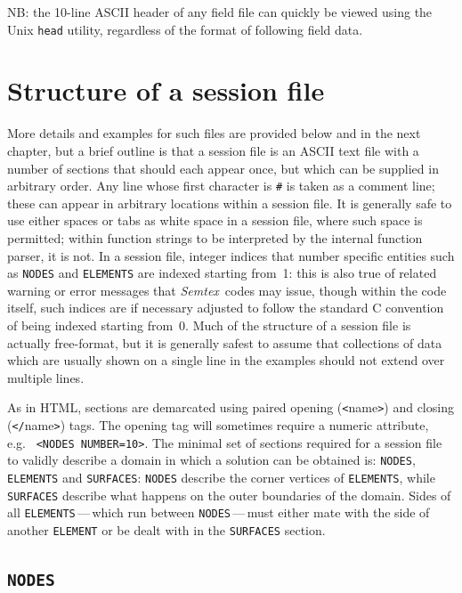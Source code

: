 \documentclass[11pt]{report}
\newcommand{\Semtex}{\emph{Semtex}} \newcommand{\Dog}{\emph{Dog}}
\newcommand{\eg}{e.g.\ } \newcommand{\CC}{\mathrm{c.c.}}
\begin{document}
NB: the 10-line ASCII header of any field file can quickly be viewed
using the Unix \verb|head| utility, regardless of the format of
following field data.

\section{Structure of a session file}
\label{sec.session}

More details and examples for such files are provided below and in the
next chapter, but a brief outline is that a session file is an ASCII
text file with a number of sections that should each appear once, but
which can be supplied in arbitrary order.  Any line whose first
character is \verb+#+ is taken as a comment line; these can appear in
arbitrary locations within a session file.  It is generally safe to
use either spaces or tabs as white space in a session file, where such
space is permitted; within function strings to be interpreted by the
internal function parser, it is not.  In a session file, integer
indices that number specific entities such as \verb|NODES| and
\verb|ELEMENTS| are indexed starting from~1: this is also true of
related warning or error messages that \Semtex\ codes may issue,
though within the code itself, such indices are if necessary adjusted
to follow the standard C convention of being indexed starting from~0.
Much of the structure of a session file is actually free-format, but
it is generally safest to assume that collections of data which are
usually shown on a single line in the examples should not extend over
multiple lines.

As in HTML, sections are demarcated using paired opening
(\verb+<+name\verb+>+) and closing (\verb+</+name\verb+>+) tags.  The
opening tag will sometimes require a numeric attribute, \eg
\verb+<NODES NUMBER=10>+.  The minimal set of sections required for a
session file to validly describe a domain in which a solution can be
obtained is: \verb+NODES+, \verb+ELEMENTS+ and \verb+SURFACES+:
\verb+NODES+ describe the corner vertices of \verb+ELEMENTS+, while
\verb+SURFACES+ describe what happens on the outer boundaries of the
domain. Sides of all \verb+ELEMENTS+\,---\,which run between
\verb+NODES+\,---\,must either mate with the side of another
\verb+ELEMENT+ or be dealt with in the \verb+SURFACES+ section.

\subsection{\texttt{NODES}}
\label{sec.nodes}
\end{document}
